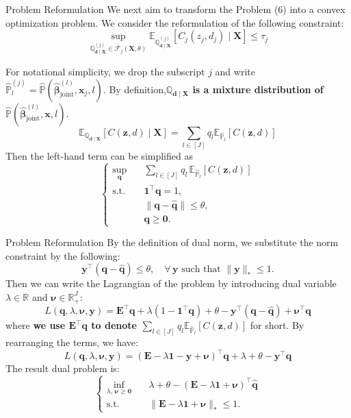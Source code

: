 \documentclass{beamer}
\newcommand{\mb}[1]{{\mathbf{#1}}}
\newcommand{\txrd}[1]{{\textcolor{sintefred}{\textbf{#1}}}}
\newcommand{\bbp}{\mathbb{P}}
\newcommand{\bbq}{\mathbb{Q}}
\newcommand{\bbr}{\mathbb{R}}
\begin{document}
\begin{frame}{Problem Reformulation}
We next aim to transform the Problem (6) into a convex optimization problem. %
We consider the reformulation of the following constraint:
\begin{equation}
\sup_{\bbq^{(j)}_{\bm d \mid \mb X} \in \mathcal{F}_j(\mb X, \theta)}  \mathbb{E}_{\bbq^{(j)}_{\bm d \mid \mb X}} \left[ C_j (z_j,  d_j)  \mid \mb X \right] \leq \tau_j
\label{eq: formulated constraint}
\end{equation}

For notational simplicity, we drop the subscript $j$ and write $\hat{\bbp}^{(j)}_l = \hat{\bbp}(\hat{\bm \beta}_{\text{joint}}^{(l)},\bm x_j, l)$. By definition,\txrd{$\bbq_{\bm d \mid \mb X}$ is a mixture distribution of $\hat{\bbp}(\hat{\bm \beta}_{\text{joint}}^{(l)},\bm x, l)$}.
\[
\mathbb{E}_{\bbq_{\bm d \mid \mb X}} \left[ C (\bm z,  d)  \mid \mb X \right] = \sum_{l \in [J]}  {q}_l \mathbb{E}_{\hat{\bbp}_l}[C (\bm z,  d)]
\]
Then the left-hand term can be simplified as
\[
\left\{
\begin{aligned}
\sup_{\bm q} \quad
& \sum_{l \in [J]} q_l \,
\mathbb{E}_{\hat{\bbp}_l}\!\left[ C(\bm z, d) \right] \\
\text{s.t.} \quad
& \bm 1^\top \bm q = 1, \\
& \|\bm q - \hat{\bm q}\| \le \theta, \\
& \bm q \ge \bm 0 .
\end{aligned}
\right.
\]
\end{frame}

\begin{frame}{Problem Reformulation}
By the definition of dual norm, we substitute the norm constraint by the following:
\[
\bm y^\top (\bm q - \hat{\bm q}) \le \theta,
\quad \forall\, \bm y \text{ such that } \|\bm y\|_* \le 1 .
\]
Then we can write the Lagrangian of the problem by introducing dual variable $\lambda \in \bbr$ and $\bm \nu \in \bbr^J_+$:
	\[
	L(\bm q, \lambda, \bm \nu, \bm y)= \mb E ^\top \bm q + \lambda (1 -  \bm 1^\top \bm q) + \theta - \bm y ^ \top (\bm q - \hat{\bm q})  + \bm \nu^\top \bm q 
	\]
where \txrd{we use $ \mb E ^\top \bm q $ to denote $\sum_{l \in [J]}  {q}_l \mathbb{E}_{\hat{\bbp}^{}_l}[C (\bm z,  d)]$} for short. By rearranging the terms, we have:
\[
	L(\bm q, \lambda, \bm \nu, \bm y) = (\mb E - \lambda \bm 1 - \bm y + \bm \nu )^\top \bm q + \lambda + \theta - \bm y ^\top \hat{\bm q}
\]
The result dual problem is:
\[
\left\{
\begin{aligned}
\inf_{\lambda,\, \bm\nu \ge \bm 0} \quad
& \lambda + \theta
- (\mb E - \lambda \bm 1 + \bm\nu)^\top \hat{\bm q}
 \\
\text{s.t.} \quad
& \|\mb E - \lambda \bm 1 + \bm\nu\|_* \le 1 .
\end{aligned}
\right.
\]

\end{frame}
\end{document}
